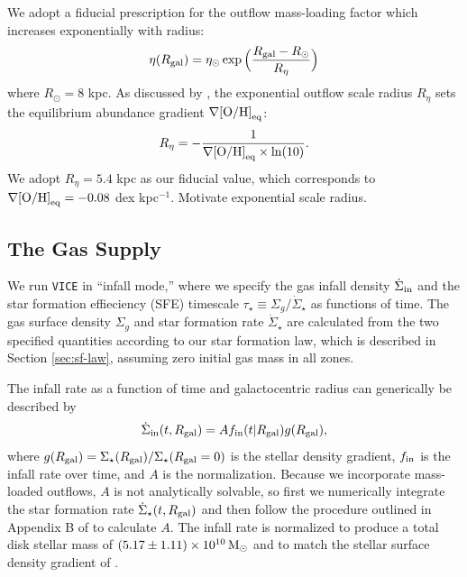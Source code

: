 \documentclass[twocolumn,twocolappendix,linenumbers]{aastex631}
\newcommand{\todo}[1]{{\color{red}#1}}
\begin{document}
We adopt a fiducial prescription for the outflow mass-loading factor which increases exponentially with radius:
\begin{equation}
    \eta(R_{\rm gal}) = \eta_\odot \exp\Big(\frac{R_{\rm gal}-R_\odot}{R_\eta}\Big)
\end{equation}
where $R_\odot=8$ kpc. As discussed by \citet{johnson_milky_2024}, the exponential outflow scale radius $R_\eta$ sets the equilibrium abundance gradient $\nabla{\rm [O/H]}_{\rm eq}$:
\begin{equation}
    R_\eta = -\frac{1}{\nabla{\rm [O/H]}_{\rm eq} \times\ln(10)}.
\end{equation}
We adopt $R_\eta=5.4$ kpc as our fiducial value, which corresponds to $\nabla{\rm [O/H]}_{\rm eq}=-0.08$ dex kpc$^{-1}$.
\todo{Motivate exponential scale radius.}

\subsection{The Gas Supply}
\label{sec:sfh}

We run {\tt VICE} in ``infall mode,'' where we specify the gas infall density $\dot\Sigma_{\rm in}$ and the star formation effieciency (SFE) timescale $\tau_\star\equiv \Sigma_g / \dot\Sigma_\star$ as functions of time. The gas surface density $\Sigma_g$ and star formation rate $\dot\Sigma_\star$ are calculated from the two specified quantities according to our star formation law, which is described in Section \ref{sec:sf-law}, assuming zero initial gas mass in all zones.

The infall rate as a function of time and galactocentric radius can generically be described by
\begin{equation}
    \label{eq:infall-rate}
    \dot\Sigma_{\rm in}(t,R_{\rm gal}) = A f_{\rm in}(t|R_{\rm gal}) g(R_{\rm gal}),
\end{equation}
where $g(R_{\rm gal})=\Sigma_\star(R_{\rm gal}) / \Sigma_\star(R_{\rm gal}=0)$ is the stellar density gradient, $f_{\rm in}$ is the infall rate over time, and $A$ is the normalization. Because we incorporate mass-loaded outflows, $A$ is not analytically solvable, so first we numerically integrate the star formation rate $\dot\Sigma_\star(t,R_{\rm gal})$ and then follow the procedure outlined in Appendix B of \citet{johnson_stellar_2021} to calculate $A$. The infall rate is normalized to produce a total disk stellar mass of $(5.17\pm1.11)\times 10^{10}\,{\rm M}_\odot$ \citep{licquia_improved_2015} and to match the stellar surface density gradient of \citet{bland-hawthorn_galaxy_2016}.
\end{document}
